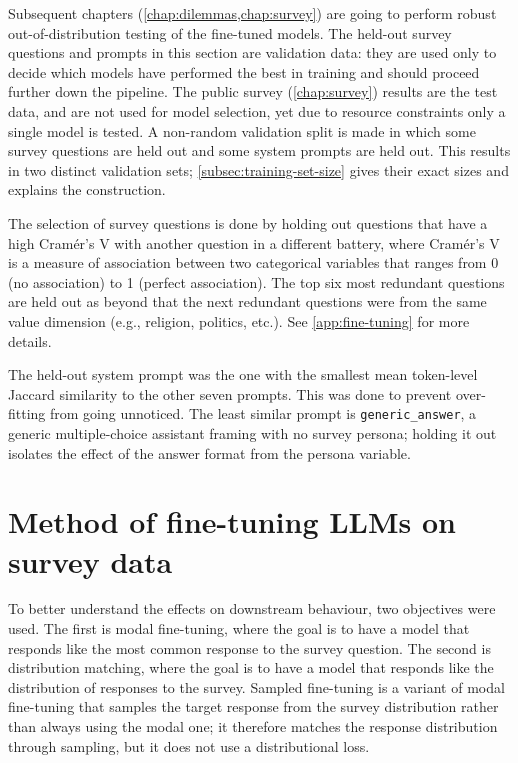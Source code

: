 Subsequent chapters (\ref{chap:dilemmas,chap:survey}) are going to perform robust out-of-distribution testing of the fine-tuned models. The held-out survey questions and prompts in this section are validation data: they are used only to decide which models have performed the best in training and should proceed further down the pipeline. The public survey (\ref{chap:survey}) results are the test data, and are not used for model selection, yet due to resource constraints only a single model is tested. A non-random validation split is made in which some survey questions are held out and some system prompts are held out. This results in two distinct validation sets; \ref{subsec:training-set-size} gives their exact sizes and explains the construction.

The selection of survey questions is done by holding out questions that have a high Cramér's V \cite{haraldcramerMathematicalMethodsStatistics1946} with another question in a different battery, where Cramér's V is a measure of association between two categorical variables that ranges from 0 (no association) to 1 (perfect association). The top six most redundant questions are held out as beyond that the next redundant questions were from the same value dimension (e.g., religion, politics, etc.). See \ref{app:fine-tuning} for more details.

The held-out system prompt was the one with the smallest mean token-level Jaccard \cite{EtudeComparativeDistribution1901} similarity to the other seven prompts. This was done to prevent over-fitting from going unnoticed. The least similar prompt is \texttt{generic\_answer}, a generic multiple-choice assistant framing with no survey persona; holding it out isolates the effect of the answer format from the persona variable.

\section{Method of fine-tuning LLMs on survey data}
\label{sec:ft-methods}

To better understand the effects on downstream behaviour, two objectives were used. The first is modal fine-tuning, where the goal is to have a model that responds like the most common response to the survey question. The second is distribution matching, where the goal is to have a model that responds like the distribution of responses to the survey. Sampled fine-tuning is a variant of modal fine-tuning that samples the target response from the survey distribution rather than always using the modal one; it therefore matches the response distribution through sampling, but it does not use a distributional loss.

